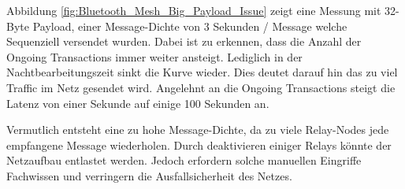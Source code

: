 Abbildung \ref{fig:Bluetooth_Mesh_Big_Payload_Issue} zeigt eine Messung mit 32-Byte Payload, einer Message-Dichte von 3 Sekunden / Message welche Sequenziell versendet wurden. Dabei ist zu erkennen, dass die Anzahl der Ongoing Transactions immer weiter ansteigt. Lediglich in der Nachtbearbeitungszeit sinkt die Kurve wieder. Dies deutet darauf hin das zu viel Traffic im Netz gesendet wird. Angelehnt an die Ongoing Transactions steigt die Latenz von einer Sekunde auf einige 100 Sekunden an.

Vermutlich entsteht eine zu hohe Message-Dichte, da zu viele Relay-Nodes jede empfangene Message wiederholen. Durch deaktivieren einiger Relays könnte der Netzaufbau entlastet werden. Jedoch erfordern solche manuellen Eingriffe Fachwissen und verringern die Ausfallsicherheit des Netzes. 
